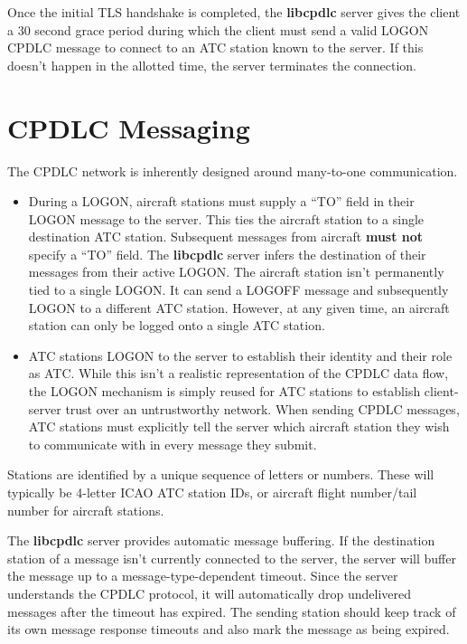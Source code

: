 \documentclass[a4paper,12pt]{article}
\newcommand{\libcpdlc}{\textbf{libcpdlc}\xspace}
\begin{document}
\noindent Once the initial TLS handshake is completed, the \libcpdlc
server gives the client a 30 second grace period during which the client
must send a valid LOGON CPDLC message to connect to an ATC station known
to the server. If this doesn't happen in the allotted time, the server
terminates the connection.

\newpage

\section{CPDLC Messaging}

The CPDLC network is inherently designed around many-to-one
communication.

\begin{itemize}

\item During a LOGON, aircraft stations must supply a ``TO'' field in
their LOGON message to the server. This ties the aircraft station to a
single destination ATC station. Subsequent messages from aircraft
\textbf{must not} specify a ``TO'' field. The \libcpdlc server infers the
destination of their messages from their active LOGON. The aircraft
station isn't permanently tied to a single LOGON. It can send a LOGOFF
message and subsequently LOGON to a different ATC station. However, at
any given time, an aircraft station can only be logged onto a single ATC
station.

\item ATC stations LOGON to the server to establish their identity
and their role as ATC. While this isn't a realistic representation of the
CPDLC data flow, the LOGON mechanism is simply reused for ATC stations to
establish client-server trust over an untrustworthy network. When sending
CPDLC messages, ATC stations must explicitly tell the server which
aircraft station they wish to communicate with in every message they
submit.

\end{itemize}

\noindent Stations are identified by a unique sequence of letters or
numbers. These will typically be 4-letter ICAO ATC station IDs, or
aircraft flight number/tail number for aircraft stations.

The \libcpdlc server provides automatic message buffering. If the
destination station of a message isn't currently connected to the server,
the server will buffer the message up to a message-type-dependent
timeout. Since the server understands the CPDLC protocol, it will
automatically drop undelivered messages after the timeout has expired.
The sending station should keep track of its own message response
timeouts and also mark the message as being expired.
\end{document}
